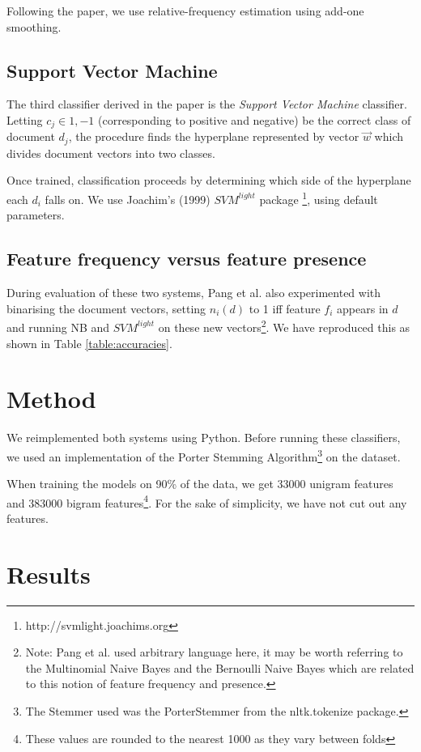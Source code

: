 \documentclass[12pt]{article}
\begin{document}
\begin{multicols}{2}
Following the paper, we use relative-frequency estimation using add-one smoothing.

\subsection{Support Vector Machine}

The third classifier derived in the paper is the \emph{Support Vector Machine} classifier. Letting $c_{j} \in {1, -1}$ (corresponding to positive and negative) be the correct class of document $d_{j}$, the procedure finds the hyperplane represented by vector $\vec{w}$ which divides document vectors into  two classes.

Once trained, classification proceeds by determining which side of the hyperplane each $d_{i}$ falls on. We use Joachim's (1999) $SVM^{light}$ package \footnote{http://svmlight.joachims.org}, using default parameters.

\subsection{Feature frequency versus feature presence}

During evaluation of these two systems, Pang et al. also experimented with binarising the document vectors, setting $n_{i}(d)$ to 1 iff feature $f_{i}$ appears in $d$ and running NB and $SVM^{light}$ on these new vectors\footnote{Note: Pang et al. used arbitrary language here, it may be worth referring to the Multinomial Naive Bayes and the Bernoulli Naive Bayes which are related to this notion of feature frequency and presence.}. We have reproduced this as shown in Table \ref{table:accuracies}.

\section{Method}

We reimplemented both systems using Python. Before running these classifiers, we used an implementation of the Porter Stemming Algorithm\footnote{The Stemmer used was the PorterStemmer from the nltk.tokenize package.} on the dataset.

When training the models on 90\% of the data, we get 33000 unigram features and 383000 bigram features\footnote{These values are rounded to the nearest 1000 as they vary between folds}. For the sake of simplicity, we have not cut out any features.

\section{Results}


\end{multicols}
\end{document}
